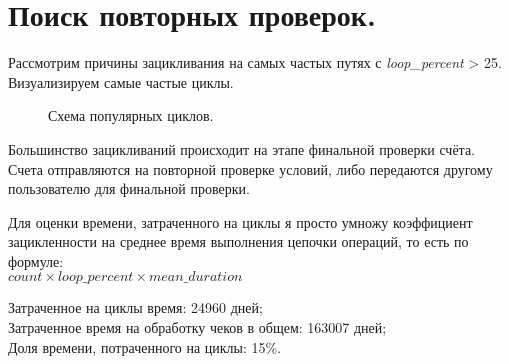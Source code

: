 \documentclass[12pt]{article}
\newcommand{\imgh}[3]
{
\begin{figure}[h]
\center{\texttt{[image: \#2]}}
\caption{#3}
\label{ris:#2}
\end{figure}
}
\begin{document}
\section{Поиск повторных проверок.}
Рассмотрим причины зацикливания на самых частых путях с \textit{loop\_percent} > 25. Визуализируем самые частые циклы.

\imgh{15cm}{looped_metric_graph.png}{Схема популярных циклов.}

Большинство зацикливаний происходит на этапе финальной проверки счёта. Счета отправляются на повторной проверке условий, либо передаются другому пользователю для финальной проверки.

Для оценки времени, затраченного на циклы я просто умножу коэффициент зацикленности на среднее время выполнения цепочки операций, то есть по формуле: \\
$count \times loop\_percent \times mean\_duration$

Затраченное на циклы время: 24960 дней; \\
Затраченное время на обработку чеков в общем: 163007 дней; \\
Доля времени, потраченного на циклы: 15\%.
\end{document}
